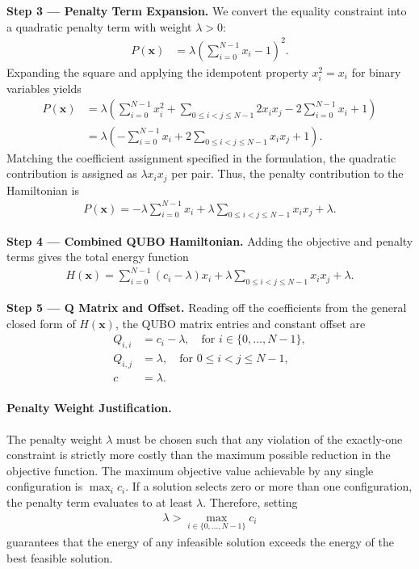 \documentclass[12pt]{article}
\begin{document}
\textbf{Step 3 --- Penalty Term Expansion.} We convert the equality constraint into a quadratic penalty term with weight $\lambda > 0$:
\begin{align}
    P(\mathbf{x}) &= \lambda \left( \sum_{i=0}^{N-1} x_i - 1 \right)^2.
\end{align}
Expanding the square and applying the idempotent property $x_i^2 = x_i$ for binary variables yields
\begin{align}
    P(\mathbf{x}) &= \lambda \left( \sum_{i=0}^{N-1} x_i^2 + \sum_{0 \le i < j \le N-1} 2 x_i x_j - 2 \sum_{i=0}^{N-1} x_i + 1 \right) \\
    &= \lambda \left( -\sum_{i=0}^{N-1} x_i + 2 \sum_{0 \le i < j \le N-1} x_i x_j + 1 \right).
\end{align}
Matching the coefficient assignment specified in the formulation, the quadratic contribution is assigned as $\lambda x_i x_j$ per pair. Thus, the penalty contribution to the Hamiltonian is
\begin{align}
    P(\mathbf{x}) = -\lambda \sum_{i=0}^{N-1} x_i + \lambda \sum_{0 \le i < j \le N-1} x_i x_j + \lambda.
\end{align}

\textbf{Step 4 --- Combined QUBO Hamiltonian.} Adding the objective and penalty terms gives the total energy function
\begin{align}
    H(\mathbf{x}) = \sum_{i=0}^{N-1} (c_i - \lambda) x_i + \lambda \sum_{0 \le i < j \le N-1} x_i x_j + \lambda.
\end{align}

\textbf{Step 5 --- Q Matrix and Offset.} Reading off the coefficients from the general closed form of $H(\mathbf{x})$, the QUBO matrix entries and constant offset are
\begin{align}
    Q_{i,i} &= c_i - \lambda, \quad \text{for } i \in \{0, \dots, N-1\}, \\
    Q_{i,j} &= \lambda, \quad \text{for } 0 \le i < j \le N-1, \\
    c &= \lambda.
\end{align}

\paragraph{Penalty Weight Justification.}
The penalty weight $\lambda$ must be chosen such that any violation of the exactly-one constraint is strictly more costly than the maximum possible reduction in the objective function. The maximum objective value achievable by any single configuration is $\max_{i} c_i$. If a solution selects zero or more than one configuration, the penalty term evaluates to at least $\lambda$. Therefore, setting
\begin{align}
    \lambda > \max_{i \in \{0, \dots, N-1\}} c_i
\end{align}
guarantees that the energy of any infeasible solution exceeds the energy of the best feasible solution.
\end{document}
